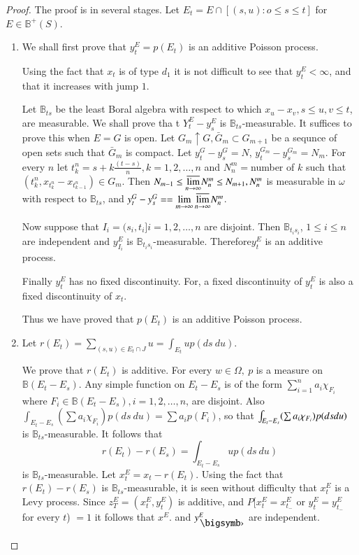 \begin{proof}
The proof is in several stages. Let $E_t = E \cap [ (s,u) : o \le s
    \le t ]$ for $E \in  \mathbb{B}^+ (S)$. 
\begin{enumerate}
\item We shall first prove that $y^E_t = p(E_t)$ is an additive
  Poisson process. 
     
  Using the fact that $x_t$ is of type $d_1$ it is not difficult to
  see that $y^E_t <  \infty$, and that it increases with jump $1$. 
  
  Let $\mathbb{B}_{ts}$ be the least Boral algebra with respect to
  which $x_u - x_v, s \le u, v \le t$, are measurable. We shall prove
  tha t $Y^E_t - y^E_s$ is $\mathbb{B}_{ts}$-measurable. It suffices
  to prove this when $E = G$ is open. Let $G_m \uparrow G, \bar{G}_m
  \subset G_{m+1}$ be a sequnce of open sets such that $\bar{G}_m$ is
  compact. Let $y^G_t-  y^G_s= N$, $y^{G_m}_t - y^{G_m}_s = N_m$. For
  every $n$ let $t^n_k=s + k \frac{(t-s)}{n}, k = 1,2, \ldots , n$ and
  $N^m_n= $number of $k$ such  that $(t^n_k, x_{t^n_k}- x_{t^n_{k-1}})
  \in G_m$. Then $N_{m-1} \le {\varlimsup\limits_{n \to \infty}}
  N^m_n \le N_{m+1}, N^m_n$ is measurable in $\omega$ with respect to
  $\mathbb{B}_{ts}$, and $y^G_t - y^G_s =  =\lim\limits_{m \to \infty}
  {\varlimsup\limits_{n \to \infty}} N^m_n$.   
  
  Now suppose that $I_i = (s_i, t_i ] i=1,2, \ldots , n$ are
  disjoint. Then $\mathbb{B}_{t_is_i}$, $1 \le i \le n$ are
  independent and $y^E_{I_i}$ is $\mathbb{B}_{{t_i}{
      s_i}}$-measurable. Therefore\pageoriginale $y^E_t$ is an
  additive process.  
   
   Finally $y^E_t$ has no fixed discontinuity. For, a fixed
   discontinuity of $y^E_t$ is also a fixed discontinuity of $x_t$. 
   
   Thus we have proved that $p(E_t)$ is an additive Poisson process.

\item Let $r(E_t)= \sum\limits_{(s,u) \in E_t \cap J} u =
   \int_{E_t} u p (ds\ du)$. 

   We prove that $r(E_t)$ is additive. For every $w \in  \Omega, ~ p$ is
   a measure on $\mathbb{B}(E_t- E_s)$. Any  simple function on $E_t -
   E_s$ is of the form $\sum\limits_{i=1}^n  a_i \chi_{F_i}$ where $F_i \in
   \mathbb{B} ({E_t}- {E_s}) , i=1,2, \ldots ,n$, are disjoint. Also
   $\int_{{E_t} -{ E_s}} ( \sum a_i \chi_{F_i}) p  (ds\ du)=  \sum a_i p
   (F_i)$, so that $\int_{{E_t} -{ E_s}} ( \sum a_i \chi_{F_i})\break p  (ds
   du)$ is $\mathbb{B}_{ts}$-measurable. It follows that  
   $$
   r(E_t) -r (E_s) = \int_{{E_t} -{ E_s}} up (ds ~ du)
   $$
   is $\mathbb{B}_{ts}$-measurable. Let $x^E_t = x_t - r (E_t)$. Using the
   fact that $r(E_t) - r(E_s)$ is $\mathbb{B}_{ts}$-measurable, it is
   seen without difficulty that $x^E_t$ is a Levy process. Since $z^E_T =
   ( x^E_t , y^E_t)$ is additive, and $P[x^E_t = x^E_{t_-}$ or $y^E_{t} =
   y^E_{t_-}$ for every $t$) $=1$ it follows that $x^E$. and $y^E_{\bigdot}$ are
   independent. 


\end{enumerate}
\end{proof}
